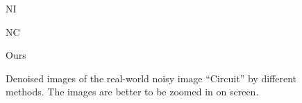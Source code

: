 \begin{figure}[ht!]
{\begin{minipage}[t]{0.19\textwidth}
{\footnotesize NI}
\end{minipage}
\begin{minipage}[t]{0.19\textwidth}
\centering
{}
{\footnotesize NC}
\end{minipage}
\begin{minipage}[t]{0.19\textwidth}
\centering
{}
{\footnotesize Ours}
\end{minipage}
}\vspace{-3mm}
    \caption{Denoised images of the real-world noisy image ``Circuit'' \cite{ncwebsite} by different methods. The images are better to be zoomed in on screen.}
    \label{fig3-11}
\end{figure}

